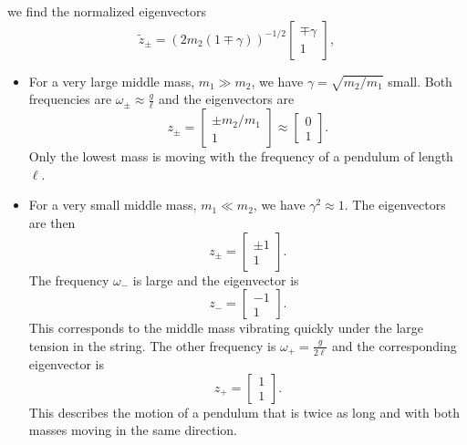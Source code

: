 \documentclass[letterpaper,11pt]{article}
\begin{document}
we find the normalized eigenvectors
\begin{equation*}
 \tilde{z}_\pm = \left(2 m_2 (1 \mp \gamma)\right)^{-1/2} \left[ \begin{array}{c} \mp \gamma \\ 1 \end{array} \right],
\end{equation*}

\begin{itemize}
 \item For a very large middle mass, $m_1 \gg m_2$, we have $\gamma = \sqrt{m_2/m_1}$ small.  Both frequencies are $\omega_\pm \approx \frac{g}{\ell}$ and the eigenvectors are
\begin{equation*}
 z_\pm = \left[ \begin{array}{c} \pm m_2/m_1 \\ 1 \end{array} \right] \approx \left[ \begin{array}{c} 0 \\ 1 \end{array} \right].
\end{equation*}
Only the lowest mass is moving with the frequency of a pendulum of length $\ell$.

\item For a very small middle mass, $m_1 \ll m_2$, we have $\gamma^2 \approx 1$.  The eigenvectors are then
\begin{equation*}
 z_\pm = \left[ \begin{array}{c} \pm 1 \\ 1 \end{array} \right].
\end{equation*}
The frequency $\omega_-$ is large and the eigenvector is
\begin{equation*}
 z_- = \left[ \begin{array}{c} -1 \\ 1 \end{array} \right].
\end{equation*}
This corresponds to the middle mass vibrating quickly under the large tension in the string.
The other frequency is $\omega_+ = \frac{g}{2\ell}$ and the corresponding eigenvector is
\begin{equation*}
 z_+ = \left[ \begin{array}{c} 1 \\ 1 \end{array} \right].
\end{equation*}
This describes the motion of a pendulum that is twice as long and with both masses moving in the same direction.
\end{itemize}
\end{document}
